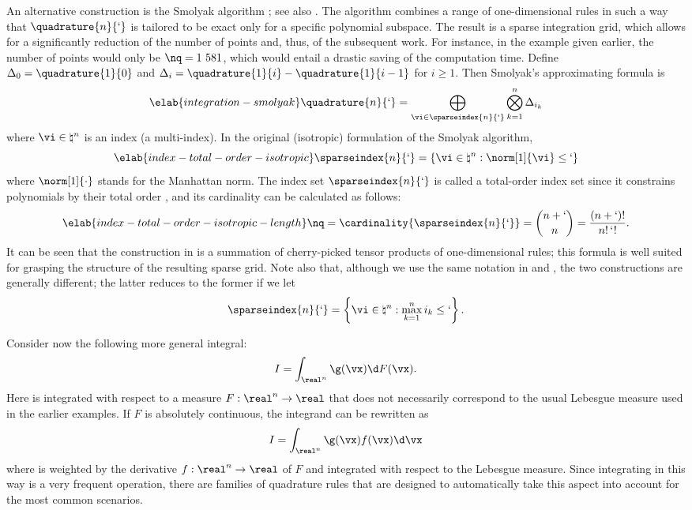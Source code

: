 An alternative construction is the Smolyak algorithm \cite{smolyak1963}; see
also \cite{eldred2008, heiss2008, maitre2010}. The algorithm combines a range of
one-dimensional rules in such a way that $\quadrature{n}{\lq}$ is tailored to be
exact only for a specific polynomial subspace. The result is a sparse
integration grid, which allows for a significantly reduction of the number of
points and, thus, of the subsequent work. For instance, in the example given
earlier, the number of points would only be $\nq = 1~581$, which would entail a
drastic saving of the computation time. Define $\Delta_0 = \quadrature{1}{0}$
and $\Delta_i = \quadrature{1}{i} - \quadrature{1}{i - 1}$ for $i \geq 1$. Then
Smolyak's approximating formula is
\begin{equation} \elab{integration-smolyak}
  \quadrature{n}{\lq} = \bigoplus_{\vi \in \sparseindex{n}{\lq}} \bigotimes_{k = 1}^n \Delta_{i_k}
\end{equation}
where $\vi \in \natural^n$ is an index (a multi-index). In the original
(isotropic) formulation of the Smolyak algorithm,
\begin{equation} \elab{index-total-order-isotropic}
  \sparseindex{n}{\lq} = \left\{ \vi \in \natural^n: \norm[1]{\vi} \leq \lq \right\}
\end{equation}
where $\norm[1]{\cdot}$ stands for the Manhattan norm. The index set
$\sparseindex{n}{\lq}$ is called a total-order index set since it constrains
polynomials by their total order \cite{eldred2008, beck2011}, and its
cardinality can be calculated as follows:
\begin{equation} \elab{index-total-order-isotropic-length}
  \nq = \cardinality{\sparseindex{n}{\lq}} = {n + \lq \choose n} = \frac{(n + \lq)!}{n! \, \lq!}.
\end{equation}
It can be seen that the construction in  is a
summation of cherry-picked tensor products of one-dimensional rules; this
formula is well suited for grasping the structure of the resulting sparse grid.
Note also that, although we use the same notation in 
and , the two constructions are generally different;
the latter reduces to the former if we let
\[
  \sparseindex{n}{\lq} = \left\{ \vi \in \natural^n: \max_{k = 1}^n i_k \leq \lq \right\}.
\]

Consider now the following more general integral:
\[
  I = \int_{\real^n} \g(\vx) \d F(\vx).
\]
Here \g is integrated with respect to a measure $F: \real^n \to \real$
\cite{durrett2010} that does not necessarily correspond to the usual Lebesgue
measure used in the earlier examples. If $F$ is absolutely continuous, the
integrand can be rewritten as
\[
  I = \int_{\real^n} \g(\vx) f(\vx) \d \vx
\]
where \g is weighted by the derivative $f: \real^n \to \real$ of $F$ and
integrated with respect to the Lebesgue measure. Since integrating in this way
is a very frequent operation, there are families of quadrature rules that are
designed to automatically take this aspect into account for the most common
scenarios.

